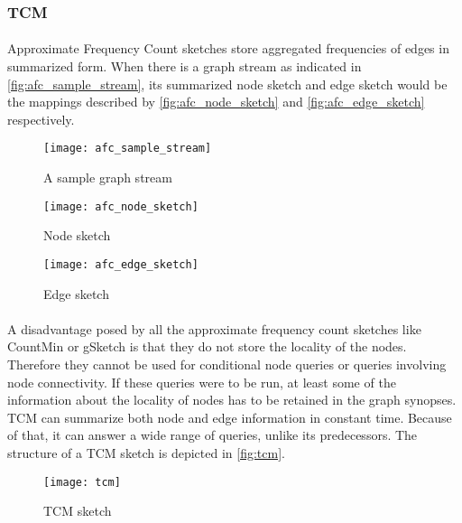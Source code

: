 \subsubsection{TCM\cite{tang_graph_2016}}

\paragraph{}
Approximate Frequency Count sketches store aggregated frequencies of edges in summarized form. When there is a graph stream as indicated in \autoref{fig:afc_sample_stream}, its summarized node sketch and edge sketch would be the mappings described by \autoref{fig:afc_node_sketch} and \autoref{fig:afc_edge_sketch} respectively.

\begin{figure}[H]
    \centering \texttt{[image: afc\_sample\_stream]}
    \caption{A sample graph stream}
    \label{fig:afc_sample_stream}
\end{figure}

\begin{figure}[H]
    \centering \texttt{[image: afc\_node\_sketch]}
    \caption{Node sketch}
    \label{fig:afc_node_sketch}
\end{figure}

\begin{figure}[H]
    \centering \texttt{[image: afc\_edge\_sketch]}
    \caption{Edge sketch}
    \label{fig:afc_edge_sketch}
\end{figure}

\paragraph{}
A disadvantage posed by all the approximate frequency count sketches like CountMin or gSketch is that they do not store the locality of the nodes. Therefore they cannot be used for conditional node queries or queries involving node connectivity. If these queries were to be run, at least some of the information about the locality of nodes has to be retained in the graph synopses. TCM can summarize both node and edge information in constant time. Because of that, it can answer a wide range of queries, unlike its predecessors. The structure of a TCM sketch is depicted in \autoref{fig:tcm}.

\begin{figure}[H]
    \centering \texttt{[image: tcm]}
    \caption{TCM sketch}
    \label{fig:tcm}
\end{figure}